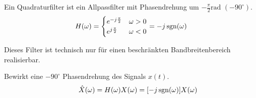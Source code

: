  \label{lti_quadratur}
Ein Quadraturfilter ist ein Allpassfilter mit Phasendrehung um $-\frac{\pi}{2}\text{rad } (-90^\circ)$. \\
$$H(\omega) = \begin{cases}
             	e^{-j \frac{\pi}{2}} & \omega > 0 \\
             	e^{j \frac{\pi}{2}} & \omega < 0
             \end{cases} =
-j \operatorname{sgn}(\omega)$$

Dieses Filter ist technisch nur für einen beschränkten Bandbreitenbereich realisierbar.

 \label{lti_hilbert}
Bewirkt eine $-90^\circ$ Phasendrehung des Signals $x(t)$.
$$\qquad \hat{X}(\omega) = H(\omega)X(\omega) = [-j \operatorname{sgn}(\omega)] X(\omega)$$